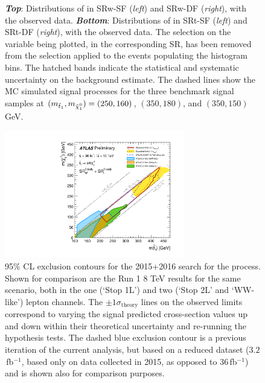 \begin{figure}[!htb]
\begin{center}
        \caption{
            \textit{\textbf{Top}}: Distributions of \rpt in SRw-SF (\textit{left}) and SRw-DF (\textit{right}), with the observed data.
            \textit{\textbf{Bottom}}: Distributions of \mdr in SRt-SF (\textit{left}) and SRt-DF (\textit{right}), with the observed data.
            The selection on the variable being plotted, in the corresponding SR, has been removed from the selection applied
            to the events populating the histogram bins.
            The hatched bands indicate the statistical and systematic uncertainty on the background estimate.
            The dashed lines show the MC simulated signal processes for the three benchmark \bWN signal samples
            at $\msn = (250,160)$, $(350,180)$, and $(350,150)$\,GeV.
        }
        \label{fig:stop_sr_unblinded}
    \end{center}
\end{figure}

\begin{figure}[!htb]
    \begin{center}
        \includegraphics[width=0.7\textwidth]{figures/search_stop2l/results/limplot_SRwt_bWN_sfdf}
        \caption{
            95\% CL exclusion contours for the 2015+2016 search for the \bWN process.
            Shown for comparison are the Run 1 8 TeV results for the same
            \bWN scenario, both in the one (`Stop 1L') and two (`Stop 2L' and `WW-like') lepton channels.
            The $\pm1 \sigma_{\text{theory}}$ lines on the observed limits correspond to varying the \bWN signal
            predicted cross-section values up and down within their theoretical uncertainty and re-running the 
            hypothesis tests.
            The dashed blue exclusion contour is a previous iteration of the current analysis, but
            based on a reduced dataset ($3.2$\,fb$^{-1}$, based only on data collected in 2015, as opposed to $36$\,fb$^{-1}$) and is shown also for comparison purposes.
        }
        \label{fig:stop_limplot}
    \end{center}
\end{figure}
